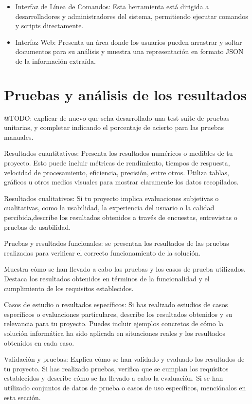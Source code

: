 \begin{itemize}
    \item Interfaz de Línea de Comandos: Esta herramienta está dirigida a desarrolladores y
    administradores del sistema, permitiendo ejecutar comandos y scripts directamente.


    \item Interfaz Web: Presenta un área donde los usuarios pueden
    arrastrar y soltar documentos para su análisis y muestra una representación en formato JSON de la información
    extraída.
\end{itemize}


\section{Pruebas y análisis de los resultados}

\colorbox{color_highlight} {@TODO: }
explicar de nuevo que seha desarrollado una test suite de pruebas unitarias, y
completar indicando el porcentaje de acierto para las pruebas manuales.

Resultados cuantitativos: Presenta los resultados numéricos o medibles de tu
proyecto.
Esto puede incluir métricas de rendimiento, tiempos de respuesta, velocidad de procesamiento, eficiencia,
precisión, entre otros.
Utiliza tablas, gráficos u otros medios visuales para mostrar claramente los datos recopilados.

Resultados cualitativos: Si tu proyecto implica evaluaciones subjetivas o cualitativas, como la usabilidad, la
experiencia del usuario o la calidad percibida,describe los resultados obtenidos a través de encuestas, entrevistas o
pruebas de usabilidad.

Pruebas y resultados funcionales: se presentan los resultados de las pruebas realizadas para verificar el correcto
funcionamiento de la solución.

Muestra cómo se han llevado a cabo las pruebas y los casos de prueba utilizados.
Destaca los resultados obtenidos en términos de la funcionalidad y el cumplimiento de los requisitos establecidos.

Casos de estudio o resultados específicos: Si has realizado estudios de casos específicos o evaluaciones particulares,
describe los resultados obtenidos y su relevancia para tu proyecto.
Puedes incluir ejemplos concretos de cómo la solución informática ha sido aplicada en situaciones reales y los
resultados obtenidos en cada caso.

Validación y pruebas: Explica cómo se han validado y evaluado los resultados de tu proyecto.
Si has realizado pruebas, verifica que se cumplan los requisitos establecidos y describe cómo se ha llevado a cabo la
evaluación.
Si se han utilizado conjuntos de datos de prueba o casos de uso específicos, menciónalos en esta sección.

